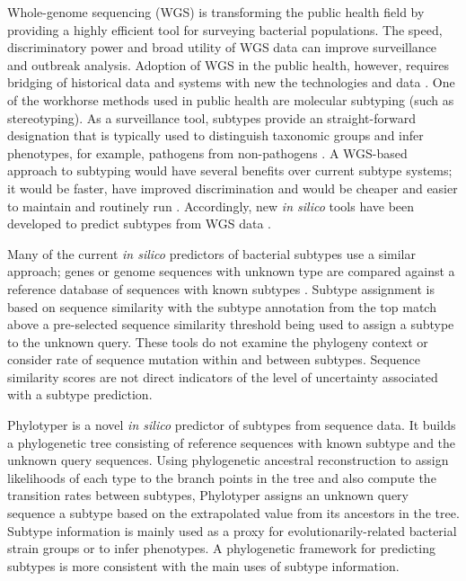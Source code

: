 \documentclass{bioinfo}
\begin{document}
Whole-genome sequencing (WGS) is transforming the public health field by providing a highly efficient tool for surveying bacterial populations.
The speed, discriminatory power and broad utility of WGS data can improve surveillance and outbreak analysis.
Adoption of WGS in the public health, however, requires bridging of historical data and systems with new the technologies and data \citep{Jenkins2015}.
One of the workhorse methods used in public health are molecular subtyping (such as stereotyping).
As a surveillance tool, subtypes provide an straight-forward designation that is typically used to distinguish taxonomic groups and infer phenotypes, for example, pathogens from non-pathogens \citep{Jenkins2015}.
A WGS-based approach to subtyping would have several benefits over current subtype systems; it would be faster, have improved discrimination and would be cheaper and easier to maintain and routinely run \citep{Jenkins2015}.
Accordingly, new \textit{in silico} tools have been developed to predict subtypes from WGS data \citep{Inouye2014,Joensen2015,Ingle2016,Lindsey2016,CARRILLO2016}.

Many of the current \textit{in silico} predictors of bacterial subtypes use a similar approach; genes or genome sequences with unknown type are compared against a reference database of sequences with known subtypes \citep{Joensen2015,CARRILLO2016,Ingle2016}.
Subtype assignment is based on sequence similarity with the subtype annotation from the top match above a pre-selected sequence similarity threshold being used to assign a subtype to the unknown query.
These tools do not examine the phylogeny context or consider rate of sequence mutation within and between subtypes.
Sequence similarity scores are not direct indicators of the level of uncertainty associated with a subtype prediction.

Phylotyper is a novel \textit{in silico} predictor of subtypes from sequence data. 
It builds a phylogenetic tree consisting of reference sequences with known subtype and the unknown query sequences.  
Using phylogenetic ancestral reconstruction to assign likelihoods of each type to the branch points in the tree and also compute the transition rates between subtypes, Phylotyper assigns an unknown query sequence a subtype based on the extrapolated value from its ancestors in the tree.
Subtype information is mainly used as a proxy for evolutionarily-related bacterial strain groups or to infer phenotypes.
A phylogenetic framework for predicting subtypes is more consistent with the main uses of subtype information.
\end{document}
